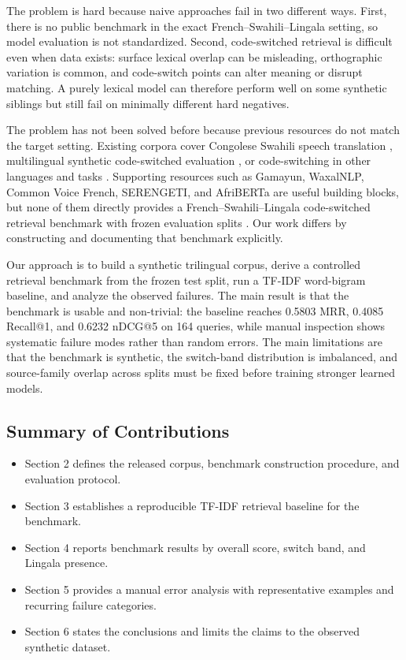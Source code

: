 \documentclass[11pt,twocolumn]{article}
\begin{document}
The problem is hard because naive approaches fail in two different ways. First, there is no public benchmark in the exact French--Swahili--Lingala setting, so model evaluation is not standardized. Second, code-switched retrieval is difficult even when data exists: surface lexical overlap can be misleading, orthographic variation is common, and code-switch points can alter meaning or disrupt matching. A purely lexical model can therefore perform well on some synthetic siblings but still fail on minimally different hard negatives.

The problem has not been solved before because previous resources do not match the target setting. Existing corpora cover Congolese Swahili speech translation \cite{denisov2021ims}, multilingual synthetic code-switched evaluation \cite{yan2025csfleurs}, or code-switching in other languages and tasks \cite{xie2025switchlingua}\cite{sailaja2025switchlangai}. Supporting resources such as Gamayun, WaxalNLP, Common Voice French, SERENGETI, and AfriBERTa are useful building blocks, but none of them directly provides a French--Swahili--Lingala code-switched retrieval benchmark with frozen evaluation splits \cite{gamayun-kit}\cite{gamayun-data}\cite{google-waxalnlp}\cite{common-voice-fr}\cite{serengeti}\cite{afriberta}. Our work differs by constructing and documenting that benchmark explicitly.

Our approach is to build a synthetic trilingual corpus, derive a controlled retrieval benchmark from the frozen test split, run a TF-IDF word-bigram baseline, and analyze the observed failures. The main result is that the benchmark is usable and non-trivial: the baseline reaches 0.5803 MRR, 0.4085 Recall@1, and 0.6232 nDCG@5 on 164 queries, while manual inspection shows systematic failure modes rather than random errors. The main limitations are that the benchmark is synthetic, the switch-band distribution is imbalanced, and source-family overlap across splits must be fixed before training stronger learned models.

\subsection{Summary of Contributions}
\begin{itemize}
\item Section 2 defines the released corpus, benchmark construction procedure, and evaluation protocol.
\item Section 3 establishes a reproducible TF-IDF retrieval baseline for the benchmark.
\item Section 4 reports benchmark results by overall score, switch band, and Lingala presence.
\item Section 5 provides a manual error analysis with representative examples and recurring failure categories.
\item Section 6 states the conclusions and limits the claims to the observed synthetic dataset.
\end{itemize}
\end{document}
